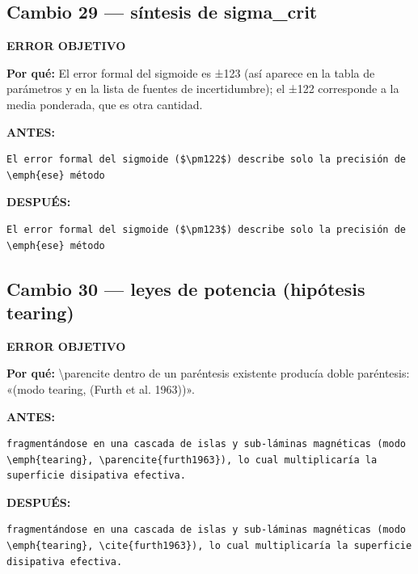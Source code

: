 \documentclass[11pt,a4paper]{article}
\begin{document}
\subsection*{Cambio 29 --- síntesis de sigma\_crit}
\colorbox{okbg}{\textbf{\footnotesize ERROR OBJETIVO}}

\textbf{Por qué:} El error formal del sigmoide es ±123 (así aparece en la tabla de parámetros y en la lista de fuentes de incertidumbre); el ±122 corresponde a la media ponderada, que es otra cantidad.

\textcolor{antesline}{\textbf{ANTES:}}
\begin{Verbatim}[breaklines=true, breakanywhere=true, fontsize=\small, frame=leftline, rulecolor=\color{antesline}, framerule=1.2pt]
El error formal del sigmoide ($\pm122$) describe solo la precisión de \emph{ese} método
\end{Verbatim}
\textcolor{despline}{\textbf{DESPUÉS:}}
\begin{Verbatim}[breaklines=true, breakanywhere=true, fontsize=\small, frame=leftline, rulecolor=\color{despline}, framerule=1.2pt]
El error formal del sigmoide ($\pm123$) describe solo la precisión de \emph{ese} método
\end{Verbatim}

\subsection*{Cambio 30 --- leyes de potencia (hipótesis tearing)}
\colorbox{okbg}{\textbf{\footnotesize ERROR OBJETIVO}}

\textbf{Por qué:} \textbackslash{}parencite dentro de un paréntesis existente producía doble paréntesis: «(modo tearing, (Furth et al. 1963))».

\textcolor{antesline}{\textbf{ANTES:}}
\begin{Verbatim}[breaklines=true, breakanywhere=true, fontsize=\small, frame=leftline, rulecolor=\color{antesline}, framerule=1.2pt]
fragmentándose en una cascada de islas y sub-láminas magnéticas (modo \emph{tearing}, \parencite{furth1963}), lo cual multiplicaría la superficie disipativa efectiva.
\end{Verbatim}
\textcolor{despline}{\textbf{DESPUÉS:}}
\begin{Verbatim}[breaklines=true, breakanywhere=true, fontsize=\small, frame=leftline, rulecolor=\color{despline}, framerule=1.2pt]
fragmentándose en una cascada de islas y sub-láminas magnéticas (modo \emph{tearing}, \cite{furth1963}), lo cual multiplicaría la superficie disipativa efectiva.
\end{Verbatim}
\end{document}
